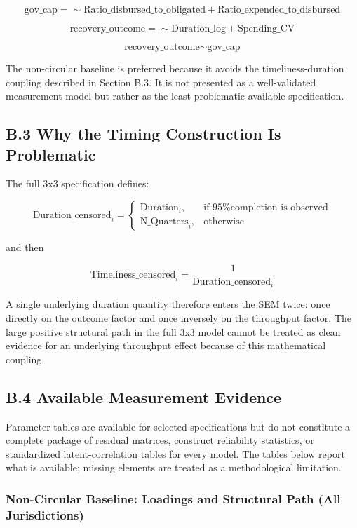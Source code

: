 \documentclass[
  number]{elsarticle}
\begin{document}
\[
\text{gov\_cap} =\!\sim \text{Ratio\_disbursed\_to\_obligated} + \text{Ratio\_expended\_to\_disbursed}
\]

\[
\text{recovery\_outcome} =\!\sim \text{Duration\_log} + \text{Spending\_CV}
\]

\[
\text{recovery\_outcome} \sim \text{gov\_cap}
\]

The non-circular baseline is preferred because it avoids the
timeliness-duration coupling described in Section B.3. It is not
presented as a well-validated measurement model but rather as the least
problematic available specification.

\subsection{B.3 Why the Timing Construction Is
Problematic}\label{b.3-why-the-timing-construction-is-problematic}

The full 3x3 specification defines:

\[
\text{Duration\_censored}_i =
\begin{cases}
\text{Duration}_i, & \text{if 95\% completion is observed} \\
\text{N\_Quarters}_i, & \text{otherwise}
\end{cases}
\]

and then

\[
\text{Timeliness\_censored}_i = \frac{1}{\text{Duration\_censored}_i}
\]

A single underlying duration quantity therefore enters the SEM twice:
once directly on the outcome factor and once inversely on the throughput
factor. The large positive structural path in the full 3x3 model cannot
be treated as clean evidence for an underlying throughput effect because
of this mathematical coupling.

\subsection{B.4 Available Measurement
Evidence}\label{b.4-available-measurement-evidence}

Parameter tables are available for selected specifications but do not
constitute a complete package of residual matrices, construct
reliability statistics, or standardized latent-correlation tables for
every model. The tables below report what is available; missing elements
are treated as a methodological limitation.

\subsubsection{Non-Circular Baseline: Loadings and Structural Path (All
Jurisdictions)}\label{non-circular-baseline-loadings-and-structural-path-all-jurisdictions}
\end{document}
